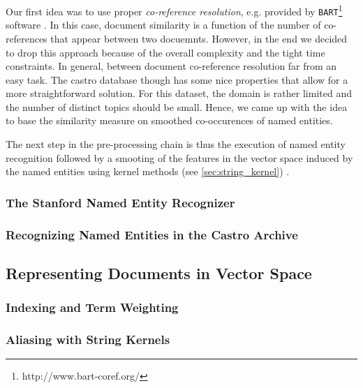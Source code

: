 Our first idea was to use proper \textit{co-reference resolution}, e.g. provided by
\texttt{BART}\footnote{http://www.bart-coref.org/} software \cite{bart}. In this case, document
similarity is a function of the number of co-references that appear between two docuemnts. However,
in the end we decided to drop this approach because of the overall complexity and the tight time
constraints. In general, between document co-reference resolution far from an easy task. The castro
database though has some nice properties that allow for a more straightforward solution. For this
dataset, the domain is rather limited and the number of distinct topics should be small. Hence, we
came up with the idea to base the similarity measure on smoothed co-occurences of named entities.

The next step in the pre-processing chain is thus the execution of named entity recognition followed
by a smooting of the features in the vector space induced by the named entities using kernel
methods (see \ref{sec:string_kernel}) \cite{string_kernel_coref}.

\subsubsection{The Stanford Named Entity Recognizer}
\label{sec:stanford_named_entity_recognizer}

\subsubsection{Recognizing Named Entities in the Castro Archive}
\label{sec:recognizing_named_enitiies_in_the_castro_archive}

\subsection {Representing Documents in Vector Space}
\label{sec:representing_documents_in_vector_space}

\subsubsection{Indexing and Term Weighting}
\label{sec:indexing_term_weighting}

\subsubsection {Aliasing with String Kernels}
\label{sec:aliasing_string_kernel}

